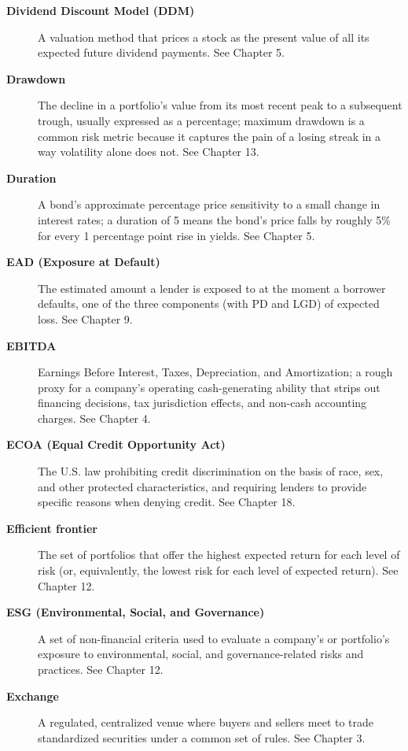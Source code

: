 \documentclass[../ai_in_finance]{subfiles}
\begin{document}
\begin{description}
\item[\textbf{Dividend Discount Model (DDM)}] A valuation method that prices a stock as the present value of all its expected future dividend payments. See Chapter 5.

\item[\textbf{Drawdown}] The decline in a portfolio's value from its most recent peak to a subsequent trough, usually expressed as a percentage; maximum drawdown is a common risk metric because it captures the pain of a losing streak in a way volatility alone does not. See Chapter 13.

\item[\textbf{Duration}] A bond's approximate percentage price sensitivity to a small change in interest rates; a duration of 5 means the bond's price falls by roughly 5\% for every 1 percentage point rise in yields. See Chapter 5.

\item[\textbf{EAD (Exposure at Default)}] The estimated amount a lender is exposed to at the moment a borrower defaults, one of the three components (with PD and LGD) of expected loss. See Chapter 9.

\item[\textbf{EBITDA}] Earnings Before Interest, Taxes, Depreciation, and Amortization; a rough proxy for a company's operating cash-generating ability that strips out financing decisions, tax jurisdiction effects, and non-cash accounting charges. See Chapter 4.

\item[\textbf{ECOA (Equal Credit Opportunity Act)}] The U.S. law prohibiting credit discrimination on the basis of race, sex, and other protected characteristics, and requiring lenders to provide specific reasons when denying credit. See Chapter 18.

\item[\textbf{Efficient frontier}] The set of portfolios that offer the highest expected return for each level of risk (or, equivalently, the lowest risk for each level of expected return). See Chapter 12.

\item[\textbf{ESG (Environmental, Social, and Governance)}] A set of non-financial criteria used to evaluate a company's or portfolio's exposure to environmental, social, and governance-related risks and practices. See Chapter 12.

\item[\textbf{Exchange}] A regulated, centralized venue where buyers and sellers meet to trade standardized securities under a common set of rules. See Chapter 3.


\end{description}
\end{document}
